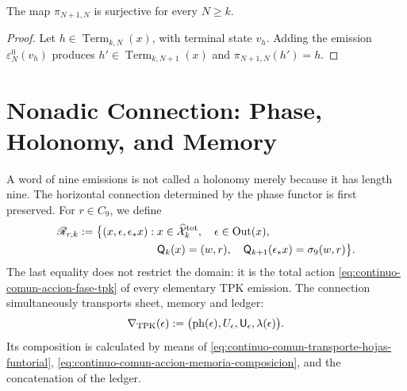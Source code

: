 \begin{lemma}
\label{lem:continuo-comun-terminal-sobreyectivo}
The map \(\pi_{N+1,N}\) is surjective for every \(N\geq k\).
\end{lemma}

\begin{proof}
Let \(h\in\operatorname{Term}_{k,N}(x)\), with terminal state \(v_h\).
Adding the emission \(\varepsilon_N^0(v_h)\) produces
\(h'\in\operatorname{Term}_{k,N+1}(x)\) and
\(\pi_{N+1,N}(h')=h\).
\end{proof}

\section{Nonadic Connection: Phase, Holonomy, and Memory}
\label{sec:continuo-comun-gamma9-total}

A word of nine emissions is not called a holonomy merely because it has
length nine. The horizontal connection determined by
the phase functor is first preserved. For \(r\in C_9\), we define
\begin{equation}
\label{eq:continuo-comun-relacion-horizontal-fase}
 \begin{split}
 \mathscr R_{r,k}:=\bigl\{
 (x,\epsilon,\epsilon_*x):\;&
 x\in\widehat{\mathcal X}^{\rm tot}_k,\quad
 \epsilon\in\operatorname{Out}(x),\\
 &\mathsf Q_k(x)=(w,r),\quad
 \mathsf Q_{k+1}(\epsilon_*x)=\sigma_9(w,r)
 \bigr\}.
 \end{split}
\end{equation}
The last equality does not restrict the domain: it is the total action
\eqref{eq:continuo-comun-accion-fase-tpk} of every elementary TPK emission. The connection simultaneously transports sheet, memory and ledger:
\begin{equation}
\label{eq:continuo-comun-conexion-tpk-generador}
 \nabla_{\rm TPK}(\epsilon):=
 \bigl(\operatorname{ph}(\epsilon),U_\epsilon,
       \mathsf U_\epsilon,\lambda(\epsilon)\bigr).
\end{equation}
Its composition is calculated by means of
\eqref{eq:continuo-comun-transporte-hojas-funtorial},
\eqref{eq:continuo-comun-accion-memoria-composicion}, and the concatenation of the
ledger.

